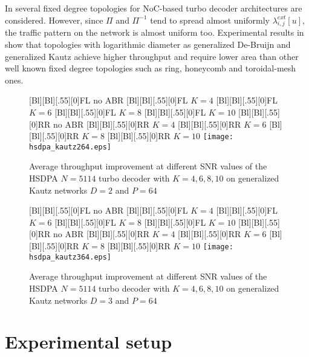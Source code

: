 \documentclass[10pt,twocolumn,journal]{IEEEtran}
\begin{document}
In \cite{martina_TCASI10} several fixed degree topologies for NoC-based turbo decoder architectures are considered. 
However, since $\Pi$ and $\Pi^{-1}$ tend to spread almost uniformly $\lambda^{ext}_{i,j}[u]$, the 
traffic pattern on the network is almost uniform too. 
Experimental results in \cite{martina_TCASI10} show that topologies with logarithmic diameter as 
generalized De-Bruijn \cite{imase_TC81} and generalized Kautz \cite{imase_TC83} 
achieve higher throughput and require lower area than other well known fixed degree topologies such as ring, 
honeycomb and toroidal-mesh ones.
\begin{figure}[t!]
  \centering
  [Bl][Bl][.55][0]{FL no ABR}
  [Bl][Bl][.55][0]{FL $K=4$}
  [Bl][Bl][.55][0]{FL $K=6$}
  [Bl][Bl][.55][0]{FL $K=8$}
  [Bl][Bl][.55][0]{FL $K=10$}
  [Bl][Bl][.55][0]{RR no ABR}
  [Bl][Bl][.55][0]{RR $K=4$}
  [Bl][Bl][.55][0]{RR $K=6$}
  [Bl][Bl][.55][0]{RR $K=8$}
  [Bl][Bl][.55][0]{RR $K=10$}
  \texttt{[image: hsdpa\_kautz264.eps]}
\caption{Average throughput improvement at different SNR values of the HSDPA $N=5114$ turbo decoder with $K=4, 6, 8, 10$ 
on generalized Kautz networks $D=2$ and $P=64$}
\label{fig:ABR_hsdpa2}
\end{figure}
\begin{figure}[t!]
    \centering
      [Bl][Bl][.55][0]{FL no ABR}
      [Bl][Bl][.55][0]{FL $K=4$}
      [Bl][Bl][.55][0]{FL $K=6$}
      [Bl][Bl][.55][0]{FL $K=8$}
      [Bl][Bl][.55][0]{FL $K=10$}
      [Bl][Bl][.55][0]{RR no ABR}
      [Bl][Bl][.55][0]{RR $K=4$}
      [Bl][Bl][.55][0]{RR $K=6$}
      [Bl][Bl][.55][0]{RR $K=8$}
      [Bl][Bl][.55][0]{RR $K=10$}
      \texttt{[image: hsdpa\_kautz364.eps]}
\caption{Average throughput improvement at different SNR values of the HSDPA $N=5114$ turbo decoder with $K=4, 6, 8, 10$ 
on generalized Kautz networks $D=3$ and $P=64$}
\label{fig:ABR_hsdpa3}
\end{figure}

\section{Experimental setup}
\label{sec:setup}
\end{document}
